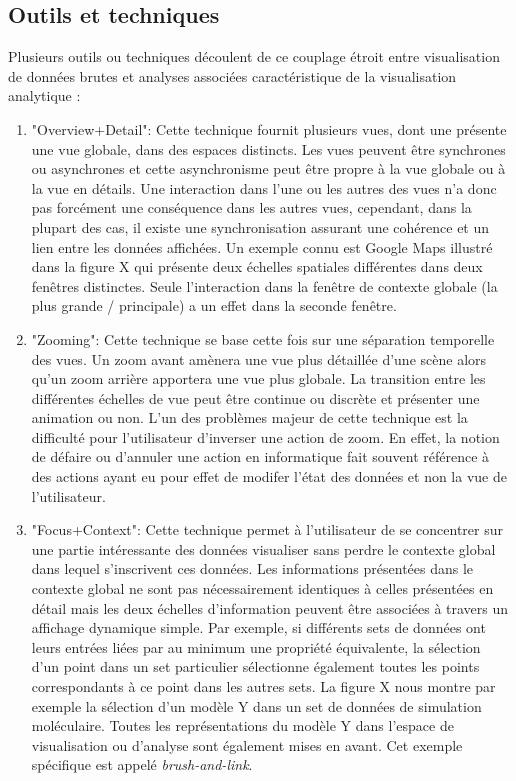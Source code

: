 \subsection{Outils et techniques}

Plusieurs outils ou techniques découlent de ce couplage étroit entre visualisation de données brutes et analyses associées caractéristique de la visualisation analytique \cite{cockburn2008review}:

\begin{enumerate}
    \item "Overview+Detail": Cette technique fournit plusieurs vues, dont une présente une vue globale, dans des espaces distincts. Les vues peuvent être synchrones ou asynchrones et cette asynchronisme peut être propre à la vue globale ou à la vue en détails. Une interaction dans l'une ou les autres des vues n'a donc pas forcément une conséquence dans les autres vues, cependant, dans la plupart des cas, il existe une synchronisation assurant une cohérence et un lien entre les données affichées. Un exemple connu est Google Maps illustré dans la figure X qui présente deux échelles spatiales différentes dans deux fenêtres distinctes. Seule l'interaction dans la fenêtre de contexte globale (la plus grande / principale) a un effet dans la seconde fenêtre.
    \item "Zooming": Cette technique se base cette fois sur une séparation temporelle des vues. Un zoom avant amènera une vue plus détaillée d'une scène alors qu'un zoom arrière apportera une vue plus globale. La transition entre les différentes échelles de vue peut être continue ou discrète et présenter une animation ou non. L'un des problèmes majeur de cette technique est la difficulté pour l'utilisateur d'inverser une action de zoom. En effet, la notion de défaire ou d'annuler une action en informatique fait souvent référence à des actions ayant eu pour effet de modifer l'état des données et non la vue de l'utilisateur.
    \item "Focus+Context": Cette technique permet à l'utilisateur de se concentrer sur une partie intéressante des données visualiser sans perdre le contexte global dans lequel s'inscrivent ces données. Les informations présentées dans le contexte global ne sont pas nécessairement identiques à celles présentées en détail mais les deux échelles d'information peuvent être associées à travers un affichage dynamique simple. Par exemple, si différents sets de données ont leurs entrées liées par au minimum une propriété équivalente, la sélection d'un point dans un set particulier sélectionne également toutes les points correspondants à ce point dans les autres sets. La figure X nous montre par exemple la sélection d'un modèle Y dans un set de données de simulation moléculaire. Toutes les représentations du modèle Y dans l'espace de visualisation ou d'analyse sont également mises en avant. Cet exemple spécifique est appelé \textit{brush-and-link}.

\end{enumerate}
